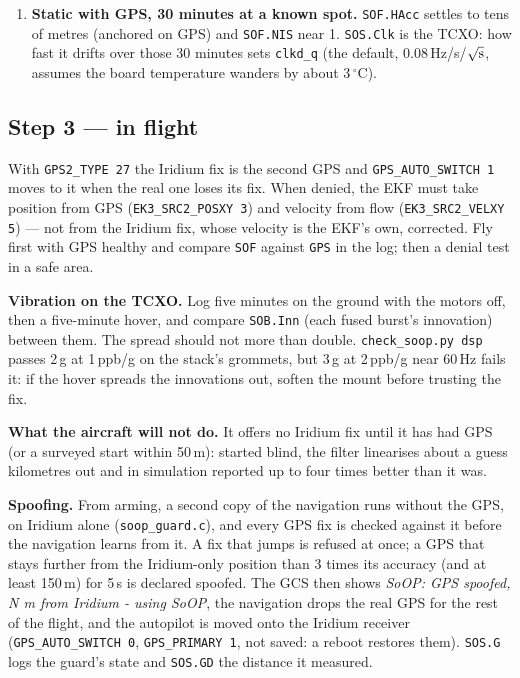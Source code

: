 \documentclass[11pt,a4paper]{article}
\newcommand{\file}[1]{\texttt{\small #1}}
\newcommand{\degC}{$^\circ$C}
\begin{document}
\begin{enumerate}
RTL-SDR. Record step 1's \file{rtl\_sdr} line while the board logs, then run
\file{soop\_bench.py} on the recording: per satellite, compare its burst count, C/N0 and
carrier sigma with the board's \file{SOB}, and gr-iridium's Ring Alert count with
\file{SOR}, the headers the board decoded itself. The board should hear at least what
gr-iridium does in the Ring Alert band: it searches where each tracked satellite is predicted
to be with a lower threshold than a blind search can afford.
\item \textbf{Static with GPS, 30 minutes at a known spot.} \file{SOF.HAcc} settles to tens of
metres (anchored on GPS) and \file{SOF.NIS} near 1. \file{SOS.Clk} is the TCXO: how fast it
drifts over those 30 minutes sets \file{clkd\_q} (the default, 0.08\,Hz/s/$\sqrt{\rm s}$,
assumes the board temperature wanders by about 3\,\degC).
\end{enumerate}

\subsection{Step 3 --- in flight}

With \file{GPS2\_TYPE 27} the Iridium fix is the second GPS and \file{GPS\_AUTO\_SWITCH 1}
moves to it when the real one loses its fix. When denied, the EKF must take position from GPS
(\file{EK3\_SRC2\_POSXY 3}) and velocity from flow (\file{EK3\_SRC2\_VELXY 5}) --- not from
the Iridium fix, whose velocity is the EKF's own, corrected. Fly first with GPS healthy and
compare \file{SOF} against \file{GPS} in the log; then a denial test in a safe area.

\textbf{Vibration on the TCXO.} Log five minutes on the ground with the motors off, then a
five-minute hover, and compare \file{SOB.Inn} (each fused burst's innovation) between them.
The spread should not more than double. \file{check\_soop.py dsp} passes 2\,g at 1\,ppb/g
on the stack's grommets, but 3\,g at 2\,ppb/g near 60\,Hz fails it: if the hover spreads
the innovations out, soften the mount before trusting the fix.

\textbf{What the aircraft will not do.} It offers no Iridium fix until it has had GPS (or a
surveyed start within 50\,m): started blind, the filter linearises about a guess kilometres
out and in simulation reported up to four times better than it was.

\textbf{Spoofing.} From arming, a second copy of the navigation runs without the GPS, on
Iridium alone (\file{soop\_guard.c}), and every GPS fix is checked against it before the
navigation learns from it. A fix that jumps is refused at once; a GPS that stays further
from the Iridium-only position than 3 times its accuracy (and at least 150\,m) for 5\,s is
declared spoofed. The GCS then shows \emph{SoOP: GPS spoofed, N m from Iridium - using
SoOP}, the navigation drops the real GPS for the rest of the flight, and the autopilot is
moved onto the Iridium receiver (\file{GPS\_AUTO\_SWITCH 0}, \file{GPS\_PRIMARY 1}, not
saved: a reboot restores them). \file{SOS.G} logs the guard's state and \file{SOS.GD} the
distance it measured.
\end{document}
